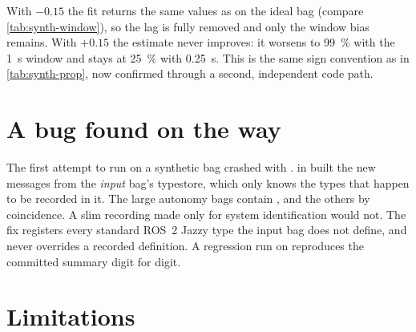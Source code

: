 With $-0.15$ the fit returns the same values as on the ideal bag (compare
\cref{tab:synth-window}), so the lag is fully removed and only the window bias remains. With
$+0.15$ the estimate never improves: it worsens to \qty{99}{\percent} with the
\qty{1}{\second} window and stays at \qty{25}{\percent} with \qty{0.25}{\second}. This is the
same sign convention as in \cref{tab:synth-prop}, now confirmed through a second, independent
code path.

\section{A bug found on the way}

The first attempt to run  on a synthetic bag crashed with
.  in
 built the new  messages from the \emph{input} bag's
typestore, which only knows the types that happen to be recorded in it. The large autonomy
bags contain ,  and the others by coincidence. A slim recording
made only for system identification would not. The fix registers every standard ROS~2 Jazzy
type the input bag does not define, and never overrides a recorded definition. A regression run on
 reproduces the committed summary digit for digit.

\section{Limitations}
\label{sec:synth-limits}

